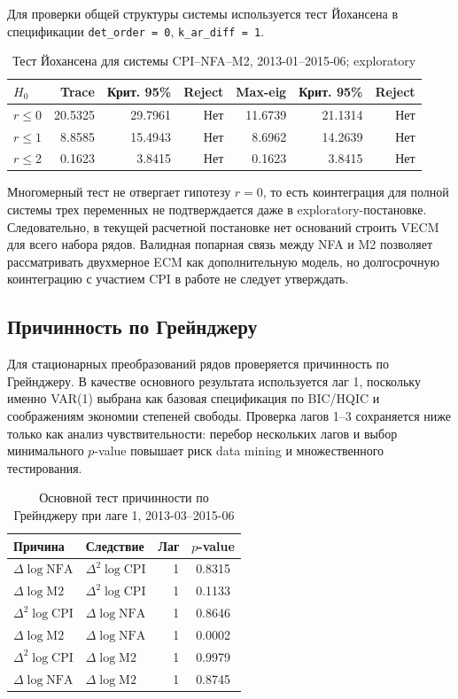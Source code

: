 \documentclass[12pt,a4paper]{article}
\begin{document}
Для проверки общей структуры системы используется тест Йохансена в спецификации
\texttt{det\_order = 0}, \texttt{k\_ar\_diff = 1}.

\begin{table}[H]
\centering
\caption{Тест Йохансена для системы CPI--NFA--M2, 2013-01--2015-06; exploratory}
\begin{tabular}{lrrrrrr}
\toprule
$H_0$ & Trace & Крит. 95\% & Reject & Max-eig & Крит. 95\% & Reject \\
\midrule
$r \le 0$ & 20.5325 & 29.7961 & Нет & 11.6739 & 21.1314 & Нет \\
$r \le 1$ & 8.8585 & 15.4943 & Нет & 8.6962 & 14.2639 & Нет \\
$r \le 2$ & 0.1623 & 3.8415 & Нет & 0.1623 & 3.8415 & Нет \\
\bottomrule
\end{tabular}
\end{table}

Многомерный тест не отвергает гипотезу $r = 0$, то есть коинтеграция для полной системы
трех переменных не подтверждается даже в exploratory-постановке. Следовательно, в текущей
расчетной постановке нет оснований строить VECM для всего набора рядов. Валидная попарная
связь между NFA и M2 позволяет рассматривать двухмерное ECM как дополнительную модель, но
долгосрочную коинтеграцию с участием CPI в работе не следует утверждать.

\subsection{Причинность по Грейнджеру}
Для стационарных преобразований рядов проверяется причинность по Грейнджеру. В качестве
основного результата используется лаг 1, поскольку именно VAR(1) выбрана как базовая
спецификация по BIC/HQIC и соображениям экономии степеней свободы. Проверка лагов 1--3
сохраняется ниже только как анализ чувствительности: перебор нескольких лагов и выбор
минимального $p$-value повышает риск data mining и множественного тестирования.

\begin{table}[H]
\centering
\caption{Основной тест причинности по Грейнджеру при лаге 1, 2013-03--2015-06}
\begin{tabular}{llrc}
\toprule
Причина & Следствие & Лаг & $p$-value \\
\midrule
$\Delta \log \mathrm{NFA}$ & $\Delta^2 \log \mathrm{CPI}$ & 1 & 0.8315 \\
$\Delta \log \mathrm{M2}$ & $\Delta^2 \log \mathrm{CPI}$ & 1 & 0.1133 \\
$\Delta^2 \log \mathrm{CPI}$ & $\Delta \log \mathrm{NFA}$ & 1 & 0.8646 \\
$\Delta \log \mathrm{M2}$ & $\Delta \log \mathrm{NFA}$ & 1 & 0.0002 \\
$\Delta^2 \log \mathrm{CPI}$ & $\Delta \log \mathrm{M2}$ & 1 & 0.9979 \\
$\Delta \log \mathrm{NFA}$ & $\Delta \log \mathrm{M2}$ & 1 & 0.8745 \\
\bottomrule
\end{tabular}
\end{table}
\end{document}
